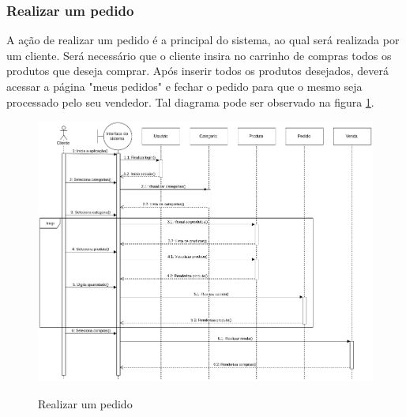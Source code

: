 \subsubsection{Realizar um pedido}
A ação de realizar um pedido é a principal do sistema, ao qual será realizada por um cliente. Será necessário que o cliente insira no carrinho de compras todos os produtos que deseja comprar. Após inserir todos os produtos desejados, deverá acessar a página "meus pedidos" e fechar o pedido para que o mesmo seja processado pelo seu vendedor. Tal diagrama pode ser observado na figura \ref{fig:sequence3}.
\begin{figure}[htbp!]
  \centering
  \caption{Realizar um pedido}
  \includegraphics[width=1\textwidth]{figs/sequence3.png}
    \label{fig:sequence3}
\end{figure}

